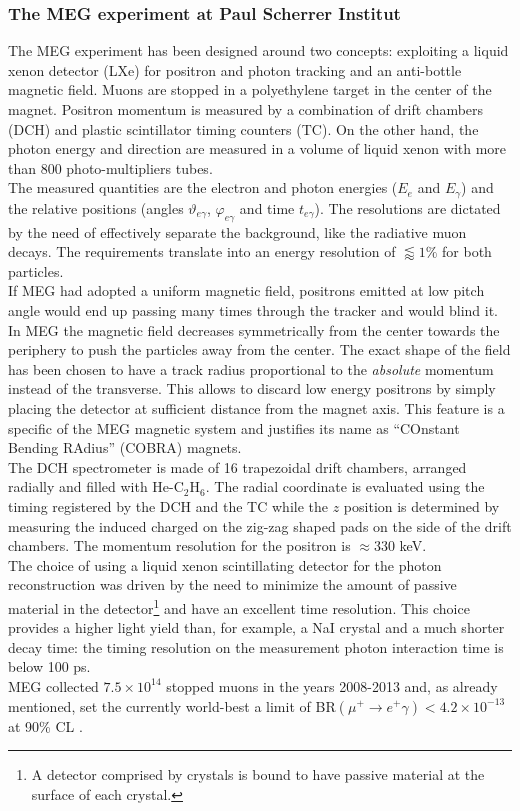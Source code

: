 \documentclass[12pt,a4paper,openright, oneside, titlepage]{book} %
\begin{document}
\subsubsection{The MEG experiment at Paul Scherrer Institut}
The MEG experiment \cite{MEG} has been designed around two concepts: 
exploiting a liquid xenon detector (LXe) for positron and photon tracking and an anti-bottle magnetic field. 
Muons are stopped in a polyethylene target in the center of the magnet. Positron momentum is measured by a combination of drift chambers (DCH) and plastic scintillator timing counters (TC). 
On the other hand, the photon energy and direction are measured in a volume of liquid xenon with more than 800 photo-multipliers tubes.\\
The measured quantities are the electron and photon energies ($E_e$ and $E_\gamma$) and the relative positions (angles $\vartheta_{e\gamma}$, $\varphi_{e\gamma}$ and time $t_{e\gamma}$). 
The resolutions are dictated by the need of effectively separate the background, like the radiative muon decays. 
The requirements translate into an energy resolution of $\lessapprox 1\%$ for both particles.\\
If MEG had adopted a uniform magnetic field, positrons emitted at low pitch angle would end up passing many times through the tracker and would blind it. In MEG the magnetic field decreases symmetrically from the center towards the periphery to push the particles away from the center. The exact shape of the field has been chosen to have a track radius proportional to the \textit{absolute} momentum instead of the transverse. 
This allows to discard low energy positrons by simply placing the detector at sufficient distance from the magnet axis. 
This feature is a specific of the MEG magnetic system and justifies its name as ``COnstant Bending RAdius'' (COBRA) magnets.\\
The DCH spectrometer is made of 16 trapezoidal drift chambers, arranged radially and filled with He-C$_2$H$_6$. The radial coordinate is evaluated using the timing registered by the DCH and the TC while the $z$ position is determined by measuring the induced charged on the zig-zag shaped pads on the side of the drift chambers. The momentum resolution for the positron is $\approx330$ keV.\\
The choice of using a liquid xenon scintillating detector for the photon reconstruction was driven by the need to minimize
the amount of passive material in the detector\footnote{A detector comprised by crystals is bound to have passive material at the surface of each crystal.} and have an excellent time resolution. 
This choice provides a higher light yield than, for example, a NaI crystal and a much shorter decay time: 
the timing resolution on the measurement photon interaction time is below 100 ps.\\
MEG collected $7.5\times10^{14}$ stopped muons in the years 2008-2013 
and, as already mentioned, 
set the currently world-best a limit of BR$(\mu^+\rightarrow e^+\gamma)<4.2\times10^{-13}$ at 90\% CL \cite{MEG}.
\end{document}
